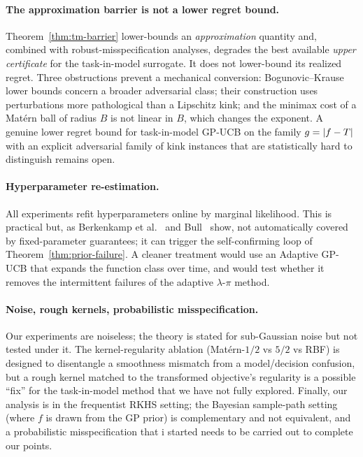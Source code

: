\paragraph{The approximation barrier is not a lower regret bound.}
Theorem~\ref{thm:tm-barrier} lower-bounds an \emph{approximation} quantity and,
combined with robust-misspecification analyses, degrades the best available
\emph{upper certificate} for the task-in-model surrogate. It does not lower-bound
its realized regret. Three obstructions prevent a mechanical conversion:
Bogunovic--Krause lower bounds concern a broader adversarial class; their
construction uses perturbations more pathological than a Lipschitz kink; and the
minimax cost of a Mat\'ern ball of radius $B$ is not linear in $B$, which changes
the exponent. A genuine lower regret bound for task-in-model GP-UCB on the family
$g=\left\lvert f-T\right\rvert$ with an explicit adversarial family of kink instances that are
statistically hard to distinguish remains open. \hfill\Popen

\paragraph{Hyperparameter re-estimation.}
All experiments refit hyperparameters online by marginal likelihood. This is
practical but, as Berkenkamp et al.~\cite{berkenkamp2019} and Bull~\cite{bull2011}
show, not automatically covered by fixed-parameter guarantees; it can trigger the
self-confirming loop of Theorem~\ref{thm:prior-failure}. A cleaner treatment
would use an Adaptive GP-UCB that expands the function class over time, and would
test whether it removes the intermittent failures of the adaptive $\lambda$-$\pi$
method.

\paragraph{Noise, rough kernels, probabilistic misspecification.}
Our experiments are noiseless; the theory is stated for sub-Gaussian noise but not
tested under it. The kernel-regularity ablation (Mat\'ern-$1/2$ vs $5/2$ vs RBF)
is designed to disentangle a smoothness mismatch from a model/decision confusion,
but a rough kernel matched to the transformed objective's regularity is a
possible ``fix'' for the task-in-model method that we have not fully explored.
Finally, our analysis is in the frequentist RKHS setting; the Bayesian
sample-path setting (where $f$ is drawn from the GP prior) is complementary and
not equivalent, and a probabilistic misspecification that i started needs to be carried out to complete our points.

